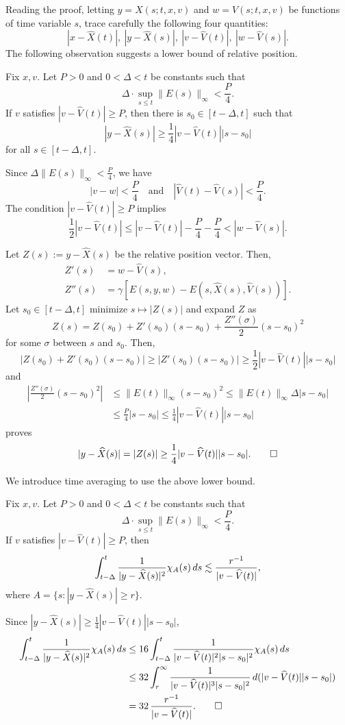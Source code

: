 \documentclass[11pt]{amsart}
\begin{document}
Reading the proof, letting $y=X(s;t,x,v)$ and $w=V(s;t,x,v)$ be functions of time variable $s$, trace carefully the following four quantities:
\[|x-\hat X(t)|,\ |y-\hat X(s)|,\ |v-\hat V(t)|,\ |w-\hat V(s)|.\]
The following observation suggests a lower bound of relative position.
\begin{prop}
Fix $x,v$.
Let $P>0$ and $0<\Delta<t$ be constants such that
\[\Delta\cdot\sup_{s\le t}\|E(s)\|_\infty<\frac P4.\]
If $v$ satisfies $|v-\hat V(t)|\ge P$, then there is $s_0\in[t-\Delta,t]$ such that
\[|y-\hat X(s)|\ge\frac14|v-\hat V(t)||s-s_0|\]
for all $s\in[t-\Delta,t]$.
\end{prop}
\begin{pf}
Since $\Delta\|E(s)\|_\infty<\frac P4$, we have
\[|v-w|<\frac P4\quad\text{and}\quad|\hat V(t)-\hat V(s)|<\frac P4.\]
The condition $|v-\hat V(t)|\ge P$ implies
\[\frac12|v-\hat V(t)|\le|v-\hat V(t)|-\frac P4-\frac P4<|w-\hat V(s)|.\]

Let $Z(s):=y-\hat X(s)$ be the relative position vector.
Then,
\begin{align*}
Z'(s)&=w-\hat V(s),\\
Z''(s)&=\gamma[E(s,y,w)-E(s,\hat X(s),\hat V(s))].
\end{align*}
Let $s_0\in[t-\Delta,t]$ minimize $s\mapsto|Z(s)|$ and expand $Z$ as
\[Z(s)=Z(s_0)+Z'(s_0)(s-s_0)+\frac{Z''(\sigma)}2(s-s_0)^2\]
for some $\sigma$ between $s$ and $s_0$.
Then,
\[|Z(s_0)+Z'(s_0)(s-s_0)|\ge|Z'(s_0)(s-s_0)|\ge\frac12|v-\hat V(t)||s-s_0|\]
and
\begin{align*}
|\frac{Z''(\sigma)}2(s-s_0)^2|
&\le\|E(t)\|_\infty(s-s_0)^2
\le\|E(t)\|_\infty\Delta|s-s_0|\\
&\le\frac P4|s-s_0|
\le\frac14|v-\hat V(t)||s-s_0|
\end{align*}
proves
\[|y-\hat X(s)|=|Z(s)|\ge\frac14|v-\hat V(t)||s-s_0|.\qedhere\]
\end{pf}

We introduce time averaging to use the above lower bound.
\begin{prop}
Fix $x,v$.
Let $P>0$ and $0<\Delta<t$ be constants such that
\[\Delta\cdot\sup_{s\le t}\|E(s)\|_\infty<\frac P4.\]
If $v$ satisfies $|v-\hat V(t)|\ge P$, then
\[\int_{t-\Delta}^t\frac1{|y-\hat X(s)|^2}\chi_A(s)\,ds\les\frac{r^{-1}}{|v-\hat V(t)|},\]
where $A=\{s:|y-\hat X(s)|\ge r\}$.
\end{prop}
\begin{pf}
Since $|y-\hat X(s)|\ge\frac14|v-\hat V(t)||s-s_0|$,
\begin{align*}
\int_{t-\Delta}^t\frac1{|y-\hat X(s)|^2}\chi_A(s)\,ds
&\le16\int_{t-\Delta}^t\frac1{|v-\hat V(t)|^2|s-s_0|^2}\chi_A(s)\,ds\\
&\le32\int_r^\infty\frac1{|v-\hat V(t)|^3|s-s_0|^2}\,d(|v-\hat V(t)||s-s_0|)\\
&=32\,\frac{r^{-1}}{|v-\hat V(t)|}.\qedhere
\end{align*}
\end{pf}
\end{document}
